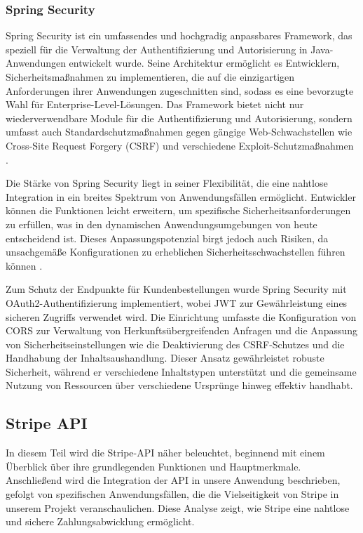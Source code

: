 \subsubsection{Spring Security}

Spring Security ist ein umfassendes und hochgradig anpassbares Framework, das speziell für die Verwaltung der Authentifizierung und Autorisierung in Java-Anwendungen entwickelt wurde. Seine Architektur ermöglicht es Entwicklern, Sicherheitsmaßnahmen zu implementieren, die auf die einzigartigen Anforderungen ihrer Anwendungen zugeschnitten sind, sodass es eine bevorzugte Wahl für Enterprise-Level-Lösungen. Das Framework bietet nicht nur wiederverwendbare Module für die Authentifizierung und Autorisierung, sondern umfasst auch Standardschutzmaßnahmen gegen gängige Web-Schwachstellen wie Cross-Site Request Forgery (CSRF) und verschiedene Exploit-Schutzmaßnahmen \cite{Spring-Security:2020}.

Die Stärke von Spring Security liegt in seiner Flexibilität, die eine nahtlose Integration in ein breites Spektrum von Anwendungsfällen ermöglicht. Entwickler können die Funktionen leicht erweitern, um spezifische Sicherheitsanforderungen zu erfüllen, was in den dynamischen Anwendungsumgebungen von heute entscheidend ist. Dieses Anpassungspotenzial birgt jedoch auch Risiken, da unsachgemäße Konfigurationen zu erheblichen Sicherheitsschwachstellen führen können \cite{Spring-Security:2020}.

Zum Schutz der Endpunkte für Kundenbestellungen wurde Spring Security mit OAuth2-Authentifizierung implementiert, wobei JWT zur Gewährleistung eines sicheren Zugriffs verwendet wird. Die Einrichtung umfasste die Konfiguration von CORS zur Verwaltung von Herkunftsübergreifenden Anfragen und die Anpassung von Sicherheitseinstellungen wie die Deaktivierung des CSRF-Schutzes und die Handhabung der Inhaltsaushandlung. Dieser Ansatz gewährleistet robuste Sicherheit, während er verschiedene Inhaltstypen unterstützt und die gemeinsame Nutzung von Ressourcen über verschiedene Ursprünge hinweg effektiv handhabt.

\subsection{Stripe API}
In diesem Teil wird die Stripe-API näher beleuchtet, beginnend mit einem Überblick über ihre grundlegenden Funktionen und Hauptmerkmale. Anschließend wird die Integration der API in unsere Anwendung beschrieben, gefolgt von spezifischen Anwendungsfällen, die die Vielseitigkeit von Stripe in unserem Projekt veranschaulichen. Diese Analyse zeigt, wie Stripe eine nahtlose und sichere Zahlungsabwicklung ermöglicht.
